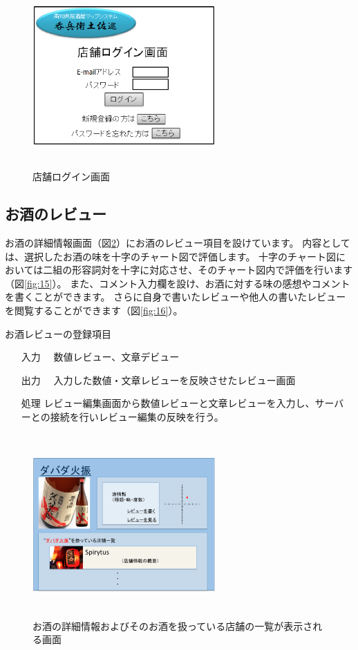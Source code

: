 \documentclass[a4j,titlepage]{jarticle}
\begin{document}
\begin{figure}[htbp]
  \begin{center}
  \includegraphics [height=7cm, width=7cm]{extrnal1_design_document_image/s5.eps}
  \caption{店舗ログイン画面}
  \label {fig:s5}
  \end{center}
\end{figure}

\newpage
\subsection{お酒のレビュー}
お酒の詳細情報画面（図\ref{fig:14}）にお酒のレビュー項目を設けています。
内容としては、選択したお酒の味を十字のチャート図で評価します。
十字のチャート図においては二組の形容詞対を十字に対応させ、そのチャート図内で評価を行います（図\ref{fig:15}）。
また、コメント入力欄を設け、お酒に対する味の感想やコメントを書くことができます。
さらに自身で書いたレビューや他人の書いたレビューを閲覧することができます（図\ref{fig:16}）。

お酒レビューの登録項目
\begin{enumerate}
  \item [入力]　数値レビュー、文章デビュー
  \item [出力]　入力した数値・文章レビューを反映させたレビュー画面
  \item [処理]  レビュー編集画面から数値レビューと文章レビューを入力し、サーバーとの接続を行いレビュー編集の反映を行う。
\end{enumerate}

\begin {figure}[htbp]
    \begin{center}
    \includegraphics [height=7cm, width=7cm]{extrnal_design_document_image/14.eps}
    \caption {お酒の詳細情報およびそのお酒を扱っている店舗の一覧が表示される画面}
    \label {fig:14}
    \end{center}
\end {figure}
\end{document}
